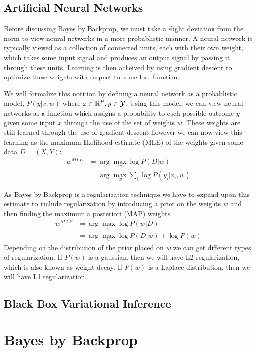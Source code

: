 \documentclass[11pt]{article}
\begin{document}
\subsection{Artificial Neural Networks}
Before discussing Bayes by Backprop, we must take a slight deviation from
the norm to view neural networks in a more probablistic manner. A neural 
network is typically viewed as a collection of connected units, each with 
their own weight, which takes some input signal and produces an output
signal by passing it through these units. Learning is then acheived by 
using gradient descent to optimize these weights with respect to some loss
function. 

We will formalize this notition by defining a neural network as a probablistic
model, $P(y|x,w)$ where $x \in {\mathbb{R}}^P, y \in \mathcal{Y}$. Using this 
model, we can view neural networks as a function which assigns a probability
to each possible outcome $y$ given some input $x$ through the use of the set
of weights $w$. These weights are still learned through the use of gradient 
descent however we can now view this learning as the maximum likelihood 
estimate (MLE) of the weights given some data $D=(X,Y)$:
\begin{align*}
  w^{MLE} &= \arg\max_w \log P(D|w) \\ 
  &= \arg\max_w \sum_i \log P(y_i|x_i, w) 
\end{align*}

As Bayes by Backprop is a regularization technique we have to expand upon this
estimate to include regularization by introducing a prior on the weights $w$ 
and then finding the maximum a posteriori (MAP) weights:
\begin{align*}
  w^{MAP} &= \arg\max_w \log P(w|D) \\
  &= \arg\max_w \log P(D|w) + \log P(w) 
\end{align*}
Depending on the distribution of the prior placed on $w$ we can get different
types of regularization. If $P(w)$ is a gaussian, then we will have L2 
regularization, which is also known as weight decay. If $P(w)$ is a
Laplace distribution, then we will have L1 regularization.


\subsection{Black Box Variational Inference}

\section{Bayes by Backprop} \label{sec:bayes_by_backprop}
\end{document}
